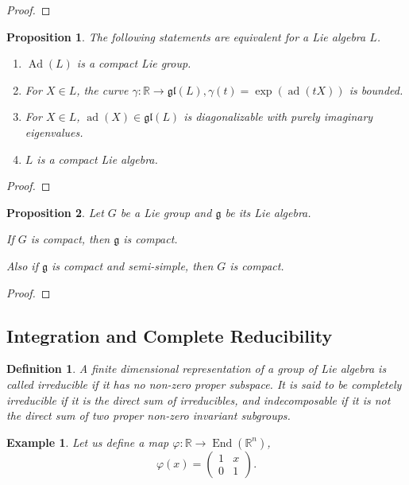 \documentclass{article}
\newtheorem{proposition}{Proposition}[section]
\newtheorem{definition}{Definition}[section]
\newtheorem{example}{Example}[section]
\numberwithin{equation}{section}
\DeclareMathOperator{\Ad}{Ad}
\DeclareMathOperator{\ad}{ad}
\DeclareMathOperator{\End}{End}
\begin{document}
\begin{proof}
\end{proof}

\begin{proposition}
The following statements are equivalent for a Lie algebra $L$.
\begin{enumerate}
\item $\Ad(L)$ is a compact Lie group.
\item For $X\in L$, the curve $\gamma:\mathbb{R}\to\mathfrak{gl}(L), \gamma(t) = \exp(\ad(tX))$ is bounded.
\item For $X\in L$, $\ad(X)\in\mathfrak{gl}(L)$ is diagonalizable with purely imaginary eigenvalues.
\item $L$ is a compact Lie algebra.
\end{enumerate}
\end{proposition}

\begin{proof}
\end{proof}

\begin{proposition}
Let $G$ be a Lie group and $\mathfrak{g}$ be its Lie algebra.\\
\par If $G$ is compact, then $\mathfrak{g}$ is compact.\\
\par Also if $\mathfrak{g}$ is compact and semi-simple, then $G$ is compact.
\end{proposition}

\begin{proof}
\end{proof}

\subsection{Integration and Complete Reducibility}

\begin{definition}
A finite dimensional representation of a group of Lie algebra is called irreducible if it has no non-zero proper subspace. It is said to be completely irreducible if it is the direct sum of irreducibles, and indecomposable if it is not the direct sum of two proper non-zero invariant subgroups. %
\end{definition}

\begin{example}
Let us define a map $\varphi:\mathbb{R}\to\End(\mathbb{R}^n)$,
\begin{equation*}
\varphi(x) = 
\begin{pmatrix}
1&x\\
0&1
\end{pmatrix}
.
\end{equation*}
\end{example}
\end{document}
